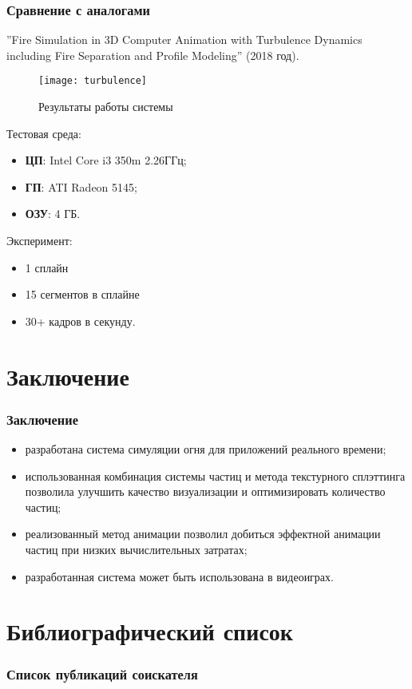 \begin{frame}[allowframebreaks]
\frametitle{Сравнение с аналогами}
''Fire Simulation
in 3D Computer Animation with Turbulence Dynamics including Fire Separation and
Profile Modeling'' (2018 год).
\begin{figure}[htb]
	\centering
    \texttt{[image: turbulence]}
    \caption{Результаты работы системы}%
    \label{fig:turbulence}
\end{figure}

Тестовая среда:
\begin{itemize}
    \item \textbf{ЦП}: Intel Core i3 350m 2.26ГГц;
    \item \textbf{ГП}: ATI Radeon 5145;
    \item \textbf{ОЗУ}: 4 ГБ.
\end{itemize}

Эксперимент:
\begin{itemize}
    \item 1 сплайн
    \item 15 сегментов в сплайне
    \item 30+ кадров в секунду.
\end{itemize}
\end{frame}

\section{Заключение}
\begin{frame}
\frametitle{Заключение}
\begin{itemize}
    \item разработана система симуляции огня для приложений реального времени;
    \item использованная комбинация системы частиц и метода текстурного
        сплэттинга позволила улучшить качество визуализации и оптимизировать
        количество частиц;
    \item реализованный метод анимации позволил добиться эффектной анимации
        частиц при низких вычислительных затратах;
    \item разработанная система может быть использована в видеоиграх.
\end{itemize}
\end{frame}

\section{Библиографический список}
\begin{frame}[t,allowframebreaks]
\frametitle{Список публикаций соискателя}
\nocite{*}
\sloppy\printbibliography[
    category=AuthorSources,
    heading=none,
    resetnumbers,
]
\end{frame}
